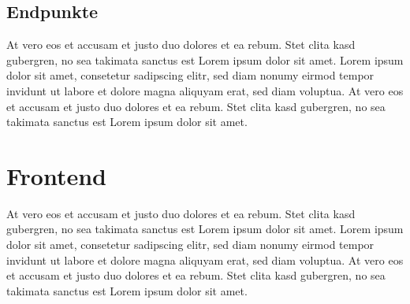 \subsection{Endpunkte}
At vero eos et accusam et justo duo dolores et ea rebum. Stet clita kasd gubergren,
no sea takimata sanctus est Lorem ipsum dolor sit amet. Lorem ipsum dolor sit amet,
consetetur sadipscing elitr, sed diam nonumy eirmod tempor invidunt ut labore et
dolore magna aliquyam erat, sed diam voluptua.
At vero eos et accusam et justo duo dolores et ea rebum.
Stet clita kasd gubergren, no sea takimata sanctus est Lorem ipsum dolor sit amet.

\section{Frontend}
At vero eos et accusam et justo duo dolores et ea rebum. Stet clita kasd gubergren,
no sea takimata sanctus est Lorem ipsum dolor sit amet. Lorem ipsum dolor sit amet,
consetetur sadipscing elitr, sed diam nonumy eirmod tempor invidunt ut labore et
dolore magna aliquyam erat, sed diam voluptua.
At vero eos et accusam et justo duo dolores et ea rebum.
Stet clita kasd gubergren, no sea takimata sanctus est Lorem ipsum dolor sit amet.
